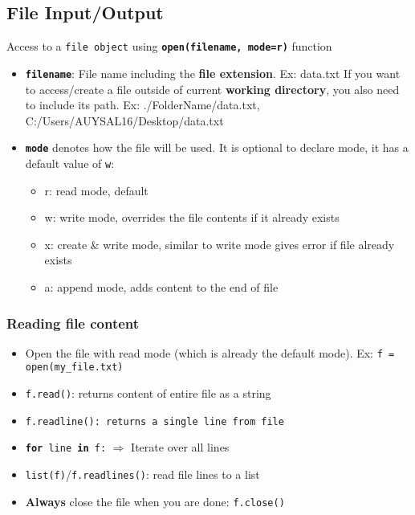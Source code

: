 \documentclass[a4paper]{article}
\begin{document}
\subsection{File Input/Output}
    Access to a \texttt{file object} using \texttt{\textbf{open(filename, mode=\textquotesingle r\textquotesingle )}} function
    \begin{itemize}
        \item \texttt{\textbf{filename}}: File name including the \textbf{file extension}. Ex: \textquotesingle data.txt\textquotesingle
        \subitem If you want to access/create a file outside of current \textbf{working directory}, you also need to include its path. Ex: \textquotesingle ./FolderName/data.txt\textquotesingle , \textquotesingle C:/Users/AUYSAL16/Desktop/data.txt\textquotesingle
        \item \textbf{\texttt{mode}} denotes how the file will be used. It is optional to declare mode, it has a default value of \texttt{w}:
        \begin{itemize}
            \item \textquotesingle r\textquotesingle : read mode, default
            \item \textquotesingle w\textquotesingle : write mode, overrides the file contents if it already exists
            \item \textquotesingle x\textquotesingle : create \& write mode, similar to write mode gives error if file already exists
            \item \textquotesingle a\textquotesingle : append mode, adds content to the end of file
        \end{itemize}
    \end{itemize}

\subsubsection{Reading file content}
    \begin{itemize}
        \item Open the file with read mode (which is already the default mode).
        \subitem Ex: \texttt{f = open(\textquotesingle my\_file.txt\textquotesingle)}
        \item \texttt{f.read()}: returns content of entire file as a string
        \item \texttt{f.readline(): returns a single line from file}
        \item \texttt{\textbf{for} line \textbf{in} f:} $\Rightarrow$ Iterate over all lines
        \item \texttt{list(f)}/\texttt{f.readlines()}: read file lines to a list
        \item \textbf{Always} close the file when you are done: \texttt{f.close()}
    \end{itemize}
\end{document}

